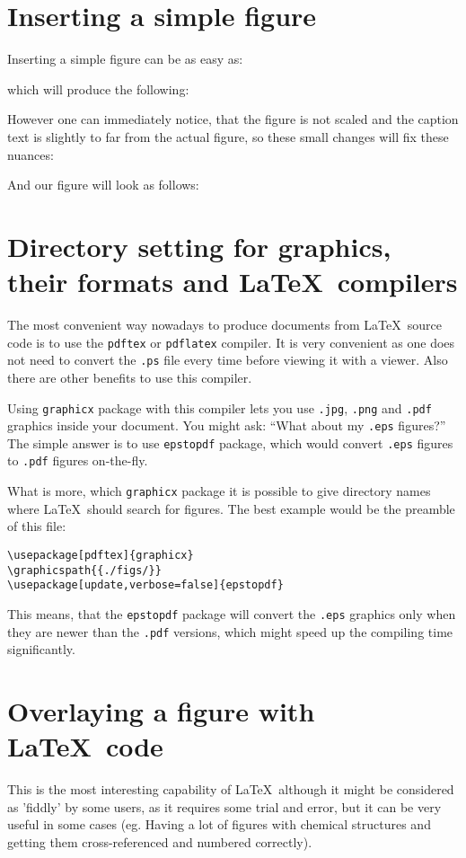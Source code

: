 \documentclass[a4paper,11pt]{article}
\begin{document}
\section{Inserting a simple figure}

Inserting a simple figure can be as easy as:

which will produce the following:


However one can immediately notice, that the figure is not scaled and the
caption text is slightly to far from the actual figure, so these small changes
will fix these nuances:

And our figure will look as follows:


\section{Directory setting for graphics, their formats and \LaTeX\ compilers}

The most convenient way nowadays to produce documents from \LaTeX\ source code
is to use the \verb|pdftex| or \verb|pdflatex| compiler. It is very convenient
as one does not need to convert the \verb|.ps| file every time before viewing it
with a viewer. Also there are other benefits to use this compiler.

Using \verb|graphicx| package with this compiler lets you use \verb|.jpg|,
\verb|.png| and \verb|.pdf| graphics inside your document. You might ask:
``What about my \verb|.eps| figures?'' The simple answer is to use
\verb|epstopdf| package, which would convert \verb|.eps| figures to \verb|.pdf|
figures on-the-fly.

What is more, which \verb|graphicx| package it is possible to give directory
names where \LaTeX\ should search for figures. The best example would be the
preamble of this file:
\begin{lstlisting}
\usepackage[pdftex]{graphicx}
\graphicspath{{./figs/}}
\usepackage[update,verbose=false]{epstopdf}
\end{lstlisting}

This means, that the \verb|epstopdf| package will convert the \verb|.eps|
graphics only when they are newer than the \verb|.pdf| versions, which might
speed up the compiling time significantly.

\section{Overlaying a figure with \LaTeX\ code}

This is the most interesting capability of \LaTeX\ although it might be
considered as 'fiddly' by some users, as it requires some trial and error, but
it can be very useful in some cases (eg. Having a lot of figures with chemical
structures and getting them cross-referenced and numbered correctly).
\end{document}
